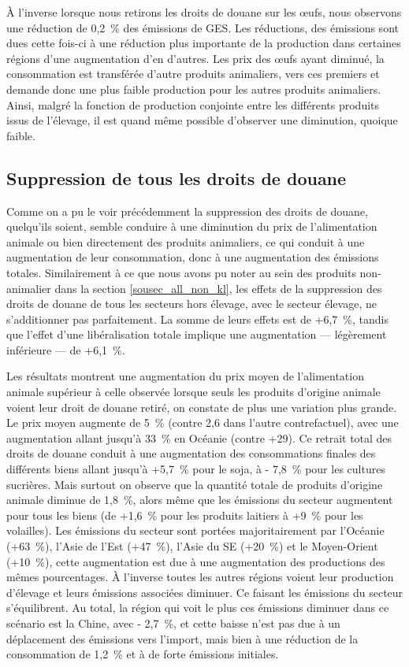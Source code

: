 À l'inverse lorsque nous retirons les droits de douane sur les œufs, nous observons une réduction de 0,2~\% des émissions de GES. Les réductions, des émissions sont dues cette fois-ci à une réduction plus importante de la production dans certaines régions d'une augmentation d'en d'autres. Les prix des œufs ayant diminué, la consommation est transférée d'autre produits animaliers, vers ces premiers et demande donc une plus faible production pour les autres produits animaliers. Ainsi, malgré la fonction de production conjointe entre les différents produits issus de l'élevage, il est quand même possible d'observer une diminution, quoique faible.


\subsection{Suppression de tous les droits de douane}

Comme on a pu le voir précédemment la suppression des droits de douane, quelqu'ils soient, semble conduire à une diminution du prix de l'alimentation animale ou bien directement des produits animaliers, ce qui conduit à une augmentation de leur consommation, donc à une augmentation des émissions totales. Similairement à ce que nous avons pu noter au sein des produits non-animalier dans la section \ref{sousec_all_non_kl}, les effets de la suppression des droits de douane de tous les secteurs hors élevage, avec le secteur élevage, ne s'additionner pas parfaitement. La somme de leurs effets est de +6,7~\%, tandis que l'effet d'une libéralisation totale implique une augmentation — légèrement inférieure — de +6,1~\%.

Les résultats montrent une augmentation du prix moyen de l'alimentation animale supérieur à celle observée lorsque seuls les produits d'origine animale voient leur droit de douane retiré, on constate de plus une variation plus grande. Le prix moyen augmente de 5~\% (contre 2,6 dans l'autre contrefactuel), avec une augmentation allant jusqu'à 33~\% en Océanie (contre +29). Ce retrait total des droits de douane conduit à une augmentation des consommations finales des différents biens allant jusqu'à +5,7~\% pour le soja, à - 7,8~\% pour les cultures sucrières. Mais surtout on observe que la quantité totale de produits d'origine animale diminue de 1,8~\%, alors même que les émissions du secteur augmentent pour tous les biens (de +1,6~\% pour les produits laitiers à +9~\% pour les volailles). Les émissions du secteur sont portées majoritairement par l'Océanie (+63~\%), l'Asie de l'Est (+47~\%), l'Asie du SE (+20~\%) et le Moyen-Orient (+10~\%), cette augmentation est due à une augmentation des productions des mêmes pourcentages. À l'inverse toutes les autres régions voient leur production d'élevage et leurs émissions associées diminuer. Ce faisant les émissions du secteur s'équilibrent. Au total, la région qui voit le plus ces émissions diminuer dans ce scénario est la Chine, avec - 2,7~\%, et cette baisse n'est pas due à un déplacement des émissions vers l'import, mais bien à une réduction de la consommation de 1,2~\% et à de forte émissions initiales.



